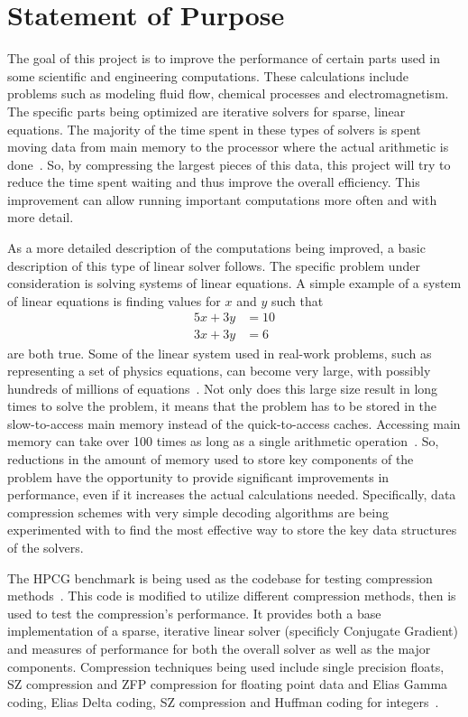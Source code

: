\documentclass[titlepage]{article}
\begin{document}
\section{Statement of Purpose}
The goal of this project is to improve the performance of certain parts
used in some scientific and engineering computations.
These calculations include problems such as modeling fluid flow, chemical processes and electromagnetism.
The specific parts being optimized are iterative solvers for sparse, linear equations.
The majority of the time spent in these types of solvers is spent moving data from main memory to the processor where the actual arithmetic is done~\cite{Lawlor:2013:compression}.
So, by compressing the largest pieces of this data, this project will try to reduce the time spent waiting and thus improve the overall efficiency.
This improvement can allow running important computations more often and with more detail.

As a more detailed description of the computations being improved, a basic description of this type of linear solver follows.
The specific problem under consideration is solving systems of linear equations.
A simple example of a system of linear equations is finding values for \(x\) and \(y\) such that
\begin{align*}
	5x + 3y &= 10\\
	3x + 3y &= 6
\end{align*}
are both true.
Some of the linear system used in real-work problems, such as representing a set of physics equations, can become very large, with possibly hundreds of millions of equations~\cite{Davis:2011:FloridaMatrixCollection}.
Not only does this large size result in long times to solve the problem,
it means that the problem has to be stored in the slow-to-access main memory instead of the quick-to-access caches.
Accessing main memory can take over 100 times as long as a single arithmetic operation~\cite{Goumas:2009:performanceEval}.
So, reductions in the amount of memory used to store key components of the problem have the opportunity to provide significant improvements in performance, even if it increases the actual calculations needed.
Specifically, data compression schemes with very simple decoding algorithms are being experimented with
to find the most effective way to store the key data structures of the solvers.

The HPCG benchmark is being used as the codebase for testing compression methods~\cite{Dongarra:2015:HPCG}.
This code is modified to utilize different compression methods, then is used to test the compression's performance.
It provides both a base implementation of a sparse, iterative linear solver (specificly Conjugate Gradient) and measures of performance for both the overall solver as well as the major components.
Compression techniques being used include single precision floats, SZ compression and ZFP compression for floating point data and Elias Gamma coding, Elias Delta coding, SZ compression and Huffman coding for integers~\cite{Di:2016:SZ,Lindstrom:2014:zfp,Elias:1975:codeword,Huffman:1952:coding}.
\end{document}
